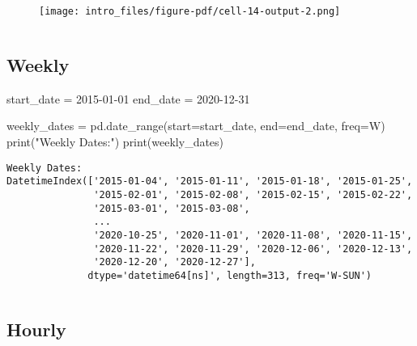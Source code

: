 \documentclass[
  letterpaper,
  DIV=11,
  numbers=noendperiod]{scrreprt}
\newenvironment{Shaded}{\begin{snugshade}}{\end{snugshade}}
\newcommand{\BuiltInTok}[1]{\textcolor[rgb]{0.00,0.23,0.31}{#1}}
\newcommand{\NormalTok}[1]{\textcolor[rgb]{0.00,0.23,0.31}{#1}}
\newcommand{\OperatorTok}[1]{\textcolor[rgb]{0.37,0.37,0.37}{#1}}
\newcommand{\StringTok}[1]{\textcolor[rgb]{0.13,0.47,0.30}{#1}}
\begin{document}
\begin{figure}[H]

{\centering \texttt{[image: intro\_files/figure-pdf/cell-14-output-2.png]}

}

\end{figure}

\begin{verbatim}
\end{verbatim}

\hypertarget{weekly}{%
\subsection{Weekly}\label{weekly}}

\begin{Shaded}
\begin{Highlighting}[]
\NormalTok{start\_date }\OperatorTok{=} \StringTok{\textquotesingle{}2015{-}01{-}01\textquotesingle{}}
\NormalTok{end\_date }\OperatorTok{=} \StringTok{\textquotesingle{}2020{-}12{-}31\textquotesingle{}}

\NormalTok{weekly\_dates }\OperatorTok{=}\NormalTok{ pd.date\_range(start}\OperatorTok{=}\NormalTok{start\_date, end}\OperatorTok{=}\NormalTok{end\_date, freq}\OperatorTok{=}\StringTok{\textquotesingle{}W\textquotesingle{}}\NormalTok{)}
\BuiltInTok{print}\NormalTok{(}\StringTok{"Weekly Dates:"}\NormalTok{)}
\BuiltInTok{print}\NormalTok{(weekly\_dates)}
\end{Highlighting}
\end{Shaded}

\begin{verbatim}
Weekly Dates:
DatetimeIndex(['2015-01-04', '2015-01-11', '2015-01-18', '2015-01-25',
               '2015-02-01', '2015-02-08', '2015-02-15', '2015-02-22',
               '2015-03-01', '2015-03-08',
               ...
               '2020-10-25', '2020-11-01', '2020-11-08', '2020-11-15',
               '2020-11-22', '2020-11-29', '2020-12-06', '2020-12-13',
               '2020-12-20', '2020-12-27'],
              dtype='datetime64[ns]', length=313, freq='W-SUN')
\end{verbatim}

\begin{verbatim}
\end{verbatim}

\hypertarget{hourly}{%
\subsection{Hourly}\label{hourly}}
\end{document}
